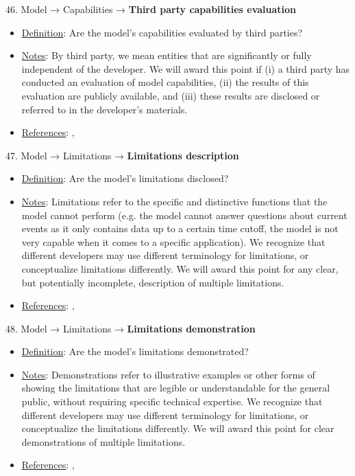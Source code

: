 46. Model → Capabilities → \textbf{Third party capabilities evaluation}
\vspace{-\parskip}
\begin{itemize}
\item
\underline{Definition}: Are the model’s capabilities evaluated by third parties?
\item
\underline{Notes}: By third party, we mean entities that are significantly or fully independent of the developer. We will award this point if (i) a third party has conducted an evaluation of model capabilities, (ii) the results of this evaluation are publicly available, and (iii) these results are disclosed or referred to in the developer’s materials.
\item
\underline{References}: \citet{raji2022audit}, \citet{liang2022helm}
\end{itemize} \vspace{\baselineskip}


47. Model → Limitations → \textbf{Limitations description}
\vspace{-\parskip}
\begin{itemize}
\item
\underline{Definition}: Are the model's limitations disclosed?
\item
\underline{Notes}: Limitations refer to the specific and distinctive functions that the model cannot perform (e.g. the model cannot answer questions about current events as it only contains data up to a certain time cutoff, the model is not very capable when it comes to a specific application). We recognize that different developers may use different terminology for limitations, or conceptualize limitations differently. We will award this point for any clear, but potentially incomplete, description of multiple limitations.
\item
\underline{References}: \citet{raji2022fallacy}, \citet{liang2022helm}
\end{itemize} \vspace{\baselineskip}


48. Model → Limitations → \textbf{Limitations demonstration}
\vspace{-\parskip}
\begin{itemize}
\item
\underline{Definition}: Are the model’s limitations demonstrated?
\item
\underline{Notes}: Demonstrations refer to illustrative examples or other forms of showing the limitations that are legible or understandable for the general public, without requiring specific technical expertise. We recognize that different developers may use different terminology for limitations, or conceptualize the limitations differently. We will award this point for clear demonstrations of multiple limitations.
\item
\underline{References}: \citet{raji2022fallacy}, \citet{liang2022helm}
\end{itemize} \vspace{\baselineskip}


